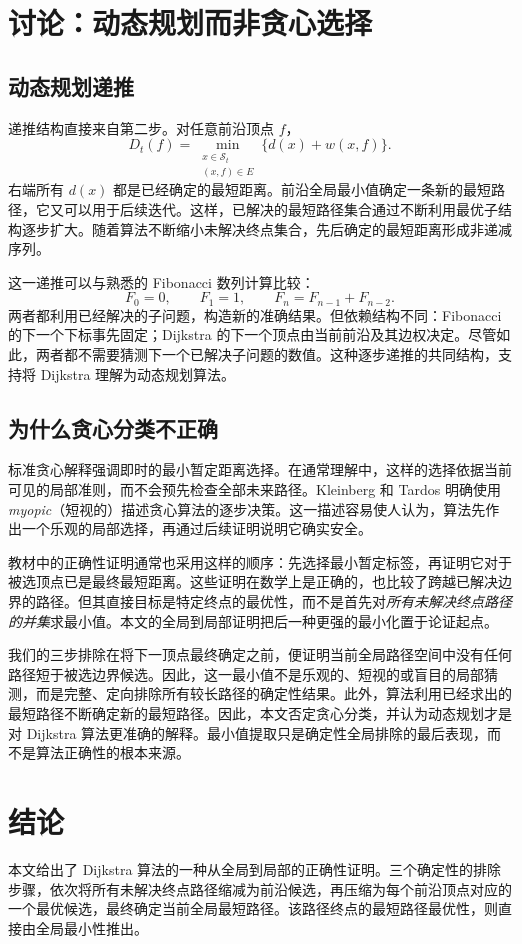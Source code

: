 \documentclass[UTF8,11pt,a4paper]{ctexart}
\newcommand{\Sset}{\mathcal S_t}
\begin{document}
\section{讨论：动态规划而非贪心选择}\label{sec:discussion}
\subsection{动态规划递推}
递推结构直接来自第二步。对任意前沿顶点 $f$，
\[
  D_t(f)=\min_{\substack{x\in\Sset\\(x,f)\in E}}
  \{d(x)+w(x,f)\}.
\]
右端所有 $d(x)$ 都是已经确定的最短距离。前沿全局最小值确定一条新的最短路径，它又可以用于后续迭代。这样，已解决的最短路径集合通过不断利用最优子结构逐步扩大。随着算法不断缩小未解决终点集合，先后确定的最短距离形成非递减序列。

这一递推可以与熟悉的 Fibonacci 数列计算比较：
\[
 F_0=0,\qquad F_1=1,\qquad F_n=F_{n-1}+F_{n-2}.
\]
两者都利用已经解决的子问题，构造新的准确结果。但依赖结构不同：Fibonacci 的下一个下标事先固定；Dijkstra 的下一个顶点由当前前沿及其边权决定。尽管如此，两者都不需要猜测下一个已解决子问题的数值。这种逐步递推的共同结构，支持将 Dijkstra 理解为动态规划算法。

\subsection{为什么贪心分类不正确}
标准贪心解释强调即时的最小暂定距离选择。在通常理解中，这样的选择依据当前可见的局部准则，而不会预先检查全部未来路径。Kleinberg 和 Tardos 明确使用 \emph{myopic}（短视的）描述贪心算法的逐步决策\cite{KleinbergTardos2006}。这一描述容易使人认为，算法先作出一个乐观的局部选择，再通过后续证明说明它确实安全。

教材中的正确性证明通常也采用这样的顺序：先选择最小暂定标签，再证明它对于被选顶点已是最终最短距离。这些证明在数学上是正确的，也比较了跨越已解决边界的路径。但其直接目标是特定终点的最优性，而不是首先对\emph{所有未解决终点路径的并集}求最小值。本文的全局到局部证明把后一种更强的最小化置于论证起点。

我们的三步排除在将下一顶点最终确定之前，便证明当前全局路径空间中没有任何路径短于被选边界候选。因此，这一最小值不是乐观的、短视的或盲目的局部猜测，而是完整、定向排除所有较长路径的确定性结果。此外，算法利用已经求出的最短路径不断确定新的最短路径。因此，本文否定贪心分类，并认为动态规划才是对 Dijkstra 算法更准确的解释。最小值提取只是确定性全局排除的最后表现，而不是算法正确性的根本来源。

\section{结论}
本文给出了 Dijkstra 算法的一种从全局到局部的正确性证明。三个确定性的排除步骤，依次将所有未解决终点路径缩减为前沿候选，再压缩为每个前沿顶点对应的一个最优候选，最终确定当前全局最短路径。该路径终点的最短路径最优性，则直接由全局最小性推出。
\end{document}
